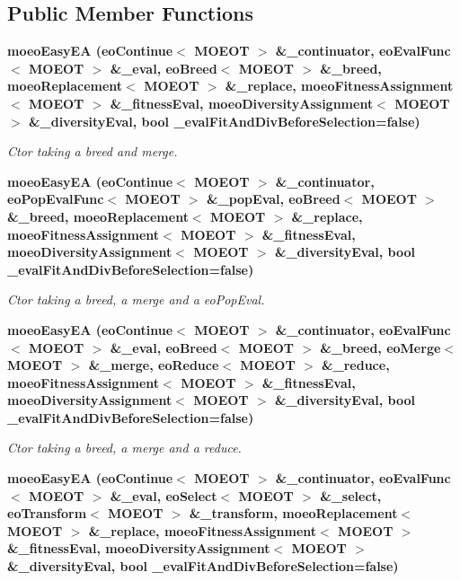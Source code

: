 \subsection*{Public Member Functions}
\begin{CompactItemize}
\item 
\bf{moeo\-Easy\-EA} (\bf{eo\-Continue}$<$ MOEOT $>$ \&\_\-continuator, \bf{eo\-Eval\-Func}$<$ MOEOT $>$ \&\_\-eval, \bf{eo\-Breed}$<$ MOEOT $>$ \&\_\-breed, \bf{moeo\-Replacement}$<$ MOEOT $>$ \&\_\-replace, \bf{moeo\-Fitness\-Assignment}$<$ MOEOT $>$ \&\_\-fitness\-Eval, \bf{moeo\-Diversity\-Assignment}$<$ MOEOT $>$ \&\_\-diversity\-Eval, bool \_\-eval\-Fit\-And\-Div\-Before\-Selection=false)
\begin{CompactList}\small\item\em Ctor taking a breed and merge. \item\end{CompactList}\item 
\bf{moeo\-Easy\-EA} (\bf{eo\-Continue}$<$ MOEOT $>$ \&\_\-continuator, \bf{eo\-Pop\-Eval\-Func}$<$ MOEOT $>$ \&\_\-pop\-Eval, \bf{eo\-Breed}$<$ MOEOT $>$ \&\_\-breed, \bf{moeo\-Replacement}$<$ MOEOT $>$ \&\_\-replace, \bf{moeo\-Fitness\-Assignment}$<$ MOEOT $>$ \&\_\-fitness\-Eval, \bf{moeo\-Diversity\-Assignment}$<$ MOEOT $>$ \&\_\-diversity\-Eval, bool \_\-eval\-Fit\-And\-Div\-Before\-Selection=false)
\begin{CompactList}\small\item\em Ctor taking a breed, a merge and a eo\-Pop\-Eval. \item\end{CompactList}\item 
\bf{moeo\-Easy\-EA} (\bf{eo\-Continue}$<$ MOEOT $>$ \&\_\-continuator, \bf{eo\-Eval\-Func}$<$ MOEOT $>$ \&\_\-eval, \bf{eo\-Breed}$<$ MOEOT $>$ \&\_\-breed, \bf{eo\-Merge}$<$ MOEOT $>$ \&\_\-merge, \bf{eo\-Reduce}$<$ MOEOT $>$ \&\_\-reduce, \bf{moeo\-Fitness\-Assignment}$<$ MOEOT $>$ \&\_\-fitness\-Eval, \bf{moeo\-Diversity\-Assignment}$<$ MOEOT $>$ \&\_\-diversity\-Eval, bool \_\-eval\-Fit\-And\-Div\-Before\-Selection=false)
\begin{CompactList}\small\item\em Ctor taking a breed, a merge and a reduce. \item\end{CompactList}\item 
\bf{moeo\-Easy\-EA} (\bf{eo\-Continue}$<$ MOEOT $>$ \&\_\-continuator, \bf{eo\-Eval\-Func}$<$ MOEOT $>$ \&\_\-eval, \bf{eo\-Select}$<$ MOEOT $>$ \&\_\-select, \bf{eo\-Transform}$<$ MOEOT $>$ \&\_\-transform, \bf{moeo\-Replacement}$<$ MOEOT $>$ \&\_\-replace, \bf{moeo\-Fitness\-Assignment}$<$ MOEOT $>$ \&\_\-fitness\-Eval, \bf{moeo\-Diversity\-Assignment}$<$ MOEOT $>$ \&\_\-diversity\-Eval, bool \_\-eval\-Fit\-And\-Div\-Before\-Selection=false)

\end{CompactItemize}
